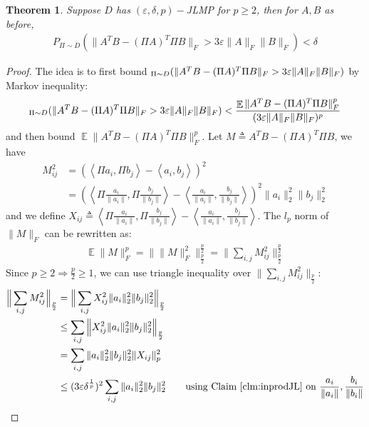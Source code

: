 \documentclass[11pt]{article}
\DeclareMathOperator*{\E}{\mathbb{E}}
\let\Pr\relax
\DeclareMathOperator*{\Pr}{\mathbb{P}}
\newcommand{\eps}{\varepsilon}
\newcommand{\inprod}[1]{\left\langle #1 \right\rangle}
\newtheorem{theorem}{Theorem}
\begin{document}
\begin{theorem}
Suppose $D$ has $(\varepsilon, \delta, p)-$JLMP for $p\geq 2$, then for $A, B$ as before,
\begin{align*}
P_{\Pi\sim D}(\|A^TB-(\Pi A)^T\Pi B\|_F>3\varepsilon\|A\|_F\|B\|_F) <\delta
\end{align*}
\end{theorem}
\begin{proof}
The idea is to first bound $\Pr_{\Pi\sim D}(\|A^TB-(\Pi A)^T\Pi B\|_F>3\varepsilon\|A\|_F\|B\|_F)$ by Markov inequality:
\begin{align}
\label{eq:markov1}
\Pr_{\Pi\sim D}(\|A^TB-(\Pi A)^T\Pi B\|_F>3\varepsilon\|A\|_F\|B\|_F)<\frac{\E \|A^TB-(\Pi A)^T\Pi B\|_F^p}{(3\varepsilon\|A\|_F\|B\|_F)^p}
\end{align}
and then bound $\E \|A^TB-(\Pi A)^T\Pi B\|_F^p$. Let $M\triangleq A^TB-(\Pi A)^T\Pi B$, we have
\begin{align*}
M_{ij}^2 &= (\inprod{\Pi a_i,\Pi b_j}-\inprod{a_i,b_j})^2\\
&= \left(\inprod{\Pi \frac{a_i}{\|a_i\|},\Pi \frac{b_j}{\|b_j\|}}-\inprod{\frac{a_i}{\|a_i\|},\frac{b_j}{\|b_j\|}}\right)^2\|a_i\|_2^2\|b_j\|_2^2
\end{align*}
and we define $X_{ij}\triangleq \inprod{\Pi \frac{a_i}{\|a_i\|},\Pi \frac{b_j}{\|b_j\|}}-\inprod{\frac{a_i}{\|a_i\|},\frac{b_j}{\|b_j\|}}$. The $l_p$ norm of $\|M\|_F$ can be rewritten as:
\begin{align}
\label{eq:Mlpnorm}
\E \|M\|_F^p = \Big\| \|M\|_F^2 \Big\|_{\frac{p}{2}}^{\frac{p}{2}} = \Big\| \sum_{i,j}M_{ij}^2 \Big\|_{\frac{p}{2}}^{\frac{p}{2}}
\end{align}
Since $p\geq 2\Rightarrow\frac{p}{2}\geq 1$, we can use triangle inequality over $\Big\| \sum_{i,j}M_{ij}^2 \Big\|_{\frac{p}{2}}$:
\begin{align*}
\Big\| \sum_{i,j}M_{ij}^2 \Big\|_{\frac{p}{2}} &= \Big\| \sum_{i,j}X_{ij}^2 \|a_i\|_2^2\|b_j\|_2^2 \Big\|_{\frac{p}{2}}\\
&\leq \sum_{i,j} \Big\|  X_{ij}^2 \|a_i\|_2^2\|b_j\|_2^2  \Big\|_{\frac{p}{2}}\\
&= \sum_{i,j} \|a_i\|_2^2\|b_j\|_2^2\|X_{ij}\|_p^2\\
&\leq (3\eps\delta^{\frac{1}{p}})^2\sum_{i,j} \|a_i\|_2^2\|b_j\|_2^2 \hspace{2em} \text{using Claim \ref{clm:inprodJL} on }\frac{a_i}{\|a_i\|}, \frac{b_i}{\|b_i\|} \\

\end{align*}
\end{proof}
\end{document}
